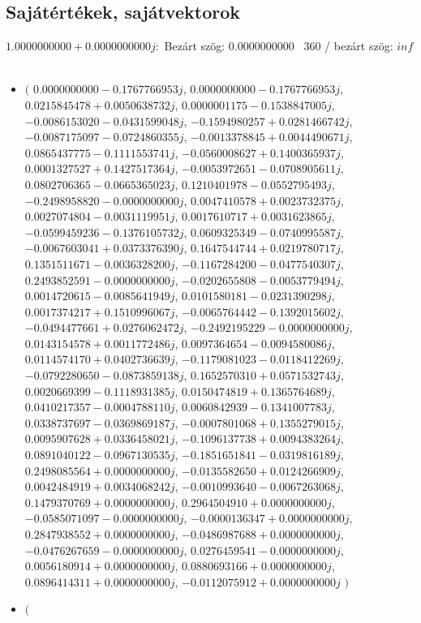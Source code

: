 \documentclass[14pt,a4paper]{article}
\begin{document}
\subsection{Sajátértékek, sajátvektorok}
$1.0000000000+0.0000000000j$:\
Bezárt szög: $0.0000000000$ \
360 / bezárt szög: $inf$\
\begin{itemize}
\item
$\big($
$0.0000000000-0.1767766953j$, $0.0000000000-0.1767766953j$, $0.0215845478+0.0050638732j$, $0.0000001175-0.1538847005j$, $-0.0086153020-0.0431599048j$, $-0.1594980257+0.0281466742j$, $-0.0087175097-0.0724860355j$, $-0.0013378845+0.0044490671j$, $0.0865437775-0.1111553741j$, $-0.0560008627+0.1400365937j$, $0.0001327527+0.1427517364j$, $-0.0053972651-0.0708905611j$, $0.0802706365-0.0665365023j$, $0.1210401978-0.0552795493j$, $-0.2498958820-0.0000000000j$, $0.0047410578+0.0023732375j$, $0.0027074804-0.0031119951j$, $0.0017610717+0.0031623865j$, $-0.0599459236-0.1376105732j$, $0.0609325349-0.0740995587j$, $-0.0067603041+0.0373376390j$, $0.1647544744+0.0219780717j$, $0.1351511671-0.0036328200j$, $-0.1167284200-0.0477540307j$, $0.2493852591-0.0000000000j$, $-0.0202655808-0.0053779494j$, $0.0014720615-0.0085641949j$, $0.0101580181-0.0231390298j$, $0.0017374217+0.1510996067j$, $-0.0065764442-0.1392015602j$, $-0.0494477661+0.0276062472j$, $-0.2492195229-0.0000000000j$, $0.0143154578+0.0011772486j$, $0.0097364654-0.0094580086j$, $0.0114574170+0.0402736639j$, $-0.1179081023-0.0118412269j$, $-0.0792280650-0.0873859138j$, $0.1652570310+0.0571532743j$, $0.0020669399-0.1118931385j$, $0.0150474819+0.1365764689j$, $0.0410217357-0.0004788110j$, $0.0060842939-0.1341007783j$, $0.0338737697-0.0369869187j$, $-0.0007801068+0.1355279015j$, $0.0095907628+0.0336458021j$, $-0.1096137738+0.0094383264j$, $0.0891040122-0.0967130535j$, $-0.1851651841-0.0319816189j$, $0.2498085564+0.0000000000j$, $-0.0135582650+0.0124266909j$, $0.0042484919+0.0034068242j$, $-0.0010993640-0.0067263068j$, $0.1479370769+0.0000000000j$, $0.2964504910+0.0000000000j$, $-0.0585071097-0.0000000000j$, $-0.0000136347+0.0000000000j$, $0.2847938552+0.0000000000j$, $-0.0486987688+0.0000000000j$, $-0.0476267659-0.0000000000j$, $0.0276459541-0.0000000000j$, $0.0056180914+0.0000000000j$, $0.0880693166+0.0000000000j$, $0.0896414311+0.0000000000j$, $-0.0112075912+0.0000000000j$
$\big)$
\item
$\big($

\end{itemize}
\end{document}
